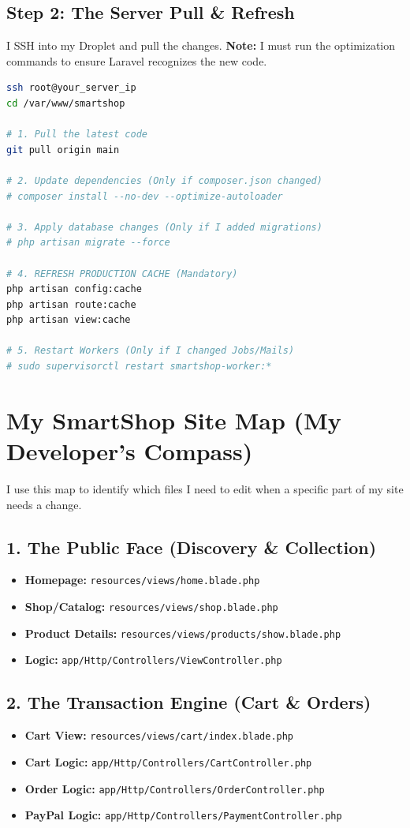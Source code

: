 \documentclass[12pt,a4paper]{article}
\begin{document}
\subsection{Step 2: The Server Pull \& Refresh}
I SSH into my Droplet and pull the changes. \textbf{Note:} I must run the optimization commands to ensure Laravel recognizes the new code.
\begin{lstlisting}[language=bash]
ssh root@your_server_ip
cd /var/www/smartshop

# 1. Pull the latest code
git pull origin main

# 2. Update dependencies (Only if composer.json changed)
# composer install --no-dev --optimize-autoloader

# 3. Apply database changes (Only if I added migrations)
# php artisan migrate --force

# 4. REFRESH PRODUCTION CACHE (Mandatory)
php artisan config:cache
php artisan route:cache
php artisan view:cache

# 5. Restart Workers (Only if I changed Jobs/Mails)
# sudo supervisorctl restart smartshop-worker:*
\end{lstlisting}

\section{My SmartShop Site Map (My Developer's Compass)}
I use this map to identify which files I need to edit when a specific part of my site needs a change.

\subsection{1. The Public Face (Discovery \& Collection)}
\begin{itemize}
    \item \textbf{Homepage:} \texttt{resources/views/home.blade.php}
    \item \textbf{Shop/Catalog:} \texttt{resources/views/shop.blade.php}
    \item \textbf{Product Details:} \texttt{resources/views/products/show.blade.php}
    \item \textbf{Logic:} \texttt{app/Http/Controllers/ViewController.php}
\end{itemize}

\subsection{2. The Transaction Engine (Cart \& Orders)}
\begin{itemize}
    \item \textbf{Cart View:} \texttt{resources/views/cart/index.blade.php}
    \item \textbf{Cart Logic:} \texttt{app/Http/Controllers/CartController.php}
    \item \textbf{Order Logic:} \texttt{app/Http/Controllers/OrderController.php}
    \item \textbf{PayPal Logic:} \texttt{app/Http/Controllers/PaymentController.php}
\end{itemize}
\end{document}
